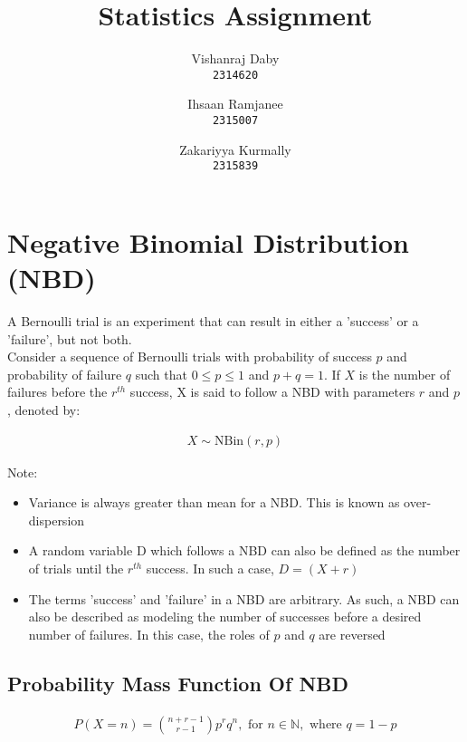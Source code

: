 \documentclass{article}
\author{
  Vishanraj Daby \\
  \texttt{2314620}
  \and
  Ihsaan Ramjanee \\
  \texttt{2315007}
  \and
  Zakariyya Kurmally \\
  \texttt{2315839}
}
\title{Statistics Assignment}
\begin{document}
\maketitle

\pagebreak

\tableofcontents

\pagebreak

\section{Negative Binomial Distribution (NBD)}
A Bernoulli trial is an experiment that can result in either a
'success' or a 'failure', but not both. \\

Consider a sequence of Bernoulli trials with probability of success
$ p $ and probability of failure $ q $ such that $ 0 \leq p \leq 1 $
and $ p + q = 1 $. If $ X $ is the number of failures before the
$ r^{th} $ success, X is said to follow a NBD with parameters $ r $
and $ p $, denoted by:

\begin{gather*}
  X \sim \text{NBin}(r, p)
\end{gather*}

Note:
\begin{itemize}
  \item Variance is always greater than mean for a NBD. This is 
    known as over-dispersion
  \item A random variable D which follows a NBD can also be defined
    as the number of trials until the $ r^{th} $ success. In such a
    case, $ D = (X + r) $
  \item The terms 'success' and 'failure' in a NBD are arbitrary.
    As such, a NBD can also be described as modeling the number
    of successes before a desired number of failures. In this case,
    the roles of $p$ and $q$ are reversed
\end{itemize}


\subsection{Probability Mass Function Of NBD}

\begin{gather*}
  P(X = n) = {{n + r - 1} \choose {r - 1}} p^r q^n, 
  \text{ for } n \in \mathbb{N}, \text{ where } q = 1-p
\end{gather*}
\end{document}
